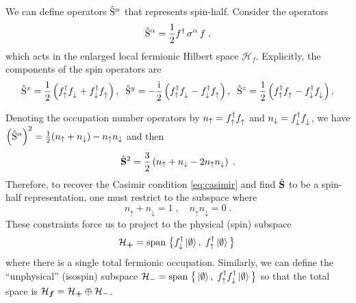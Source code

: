 We can define operators $\hat{\mathrm{S}}^\alpha$ that represents spin-half. Consider the operators
 \begin{equation}
      \hat{\mathrm{S}}^\alpha = \frac{1}{2} f^\dagger \, \sigma^\alpha \, f \; ,
 \end{equation}
which acts in the enlarged local fermionic Hilbert space $\mathcal{H}_f$. Explicitly, the components of the spin operators are
\begin{equation}\!\!
    \hat{\rmS}^x =
    \frac{1}{2}\left( f_{\uparrow}^\dagger f_{\downarrow}^\pd
    +f_{\downarrow}^\dagger f_{\uparrow}^\pd \right)
    ,\;\;
    \hat{\rmS}^y = -\frac{\im}{2}\left(
    f_{\uparrow}^\dagger f_{\downarrow}^\pd
    -f_{\downarrow}^\dagger f_{\uparrow}^\pd  \right)
    , \;\;
    \hat{\rmS}^z = \frac{1}{2}\left(
    f_{\uparrow}^\dagger f_{\uparrow}^\pd
    -f_{\downarrow}^\dagger f_{\downarrow}^\pd \right).
  \!\!  \end{equation}

Denoting the occupation number operators by $n_{\uparrow}=f_{\uparrow}^\dagger f_{\uparrow}^\pd$ and $n_{\downarrow}=f_{\downarrow}^\dagger f_{\downarrow}^\pd $, %
we have $\left( \hat{\mathrm{S}}^{\alpha} \right)^2  = \frac{1}{2}(n_\uparrow + n_\downarrow) - n_\uparrow n_\downarrow$ and then
\begin{equation}
    \hat{\mathbf{S}}^2 = \frac{3}{2} \left( n_\uparrow + n_\downarrow - 2 n_\uparrow n_\downarrow \right) \; .
\end{equation}
Therefore, to recover the Casimir condition \eqref{eq:casimir} and find $ \hat{\mathbf S}$ to be a spin-half representation, one must restrict to the subspace where
\begin{equation}
    n_\uparrow + n_\downarrow = 1 \; , \quad n_\uparrow n_\downarrow = 0 \; . \label{eq:single-ocupation}
\end{equation}
These constraints force us to project to the physical (spin) subspace
\begin{equation}
    \mathcal{H}_{\bm{+}}
    =\mathrm{span}\; \big\{
    f_{\downarrow}^\dagger \ket{\emptyset},\;
    f_{\uparrow}^\dagger \ket{\emptyset}
    \big\} \;
\end{equation}
where there is a single total fermionic occupation.
Similarly, we can define the ``unphysical'' (isospin) subspace $ \mathcal{H}_{{-}}=\mathrm{span}\; \big\{  \ket{\emptyset},\;   f_{\uparrow}^\dagger f_{\downarrow}^\dagger \ket{\emptyset}  \big\} $ so that the total space is $\mathcal{H}_{\bm{f}}=\mathcal{H}_{\bm{+}}\oplus \mathcal{H}_{\mathbf{-}}$.

